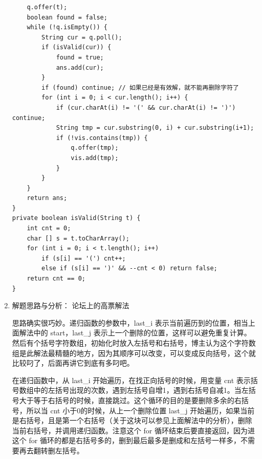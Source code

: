 \documentclass[9pt, b5paaper]{book}
\begin{document}
\begin{enumerate}
\begin{verbatim}
    q.offer(t);
    boolean found = false;
    while (!q.isEmpty()) {
        String cur = q.poll();
        if (isValid(cur)) {
            found = true;
            ans.add(cur);
        }
        if (found) continue; // 如果已经是有效解，就不能再删除字符了
        for (int i = 0; i < cur.length(); i++) {
            if (cur.charAt(i) != '(' && cur.charAt(i) != ')') continue;
            String tmp = cur.substring(0, i) + cur.substring(i+1);
            if (!vis.contains(tmp)) {
                q.offer(tmp);
                vis.add(tmp);
            }
        }
    }
    return ans;
}
private boolean isValid(String t) {
    int cnt = 0;
    char [] s = t.toCharArray();
    for (int i = 0; i < t.length(); i++) 
        if (s[i] == '(') cnt++;
        else if (s[i] == ')' && --cnt < 0) return false;
    return cnt == 0;
}
\end{verbatim}
\item 解题思路与分析： 论坛上的高票解法
\label{sec-8-0-7-3}

思路确实很巧妙。递归函数的参数中，last\_i 表示当前遍历到的位置，相当上面解法中的 start，last\_j 表示上一个删除的位置，这样可以避免重复计算。然后有个括号字符数组，初始化时放入左括号和右括号，博主认为这个字符数组是此解法最精髓的地方，因为其顺序可以改变，可以变成反向括号，这个就比较叼了，后面再讲它到底有多叼吧。

在递归函数中，从 last\_i 开始遍历，在找正向括号的时候，用变量 cnt 表示括号数组中的左括号出现的次数，遇到左括号自增1，遇到右括号自减1。当左括号大于等于右括号的时候，直接跳过。这个循环的目的是要删除多余的右括号，所以当 cnt 小于0的时候，从上一个删除位置 last\_j 开始遍历，如果当前是右括号，且是第一个右括号（关于这块可以参见上面解法中的分析），删除当前右括号，并调用递归函数。注意这个 for 循环结束后要直接返回，因为进这个 for 循环的都是右括号多的，删到最后最多是删成和左括号一样多，不需要再去翻转删左括号。


\end{enumerate}
\end{document}
